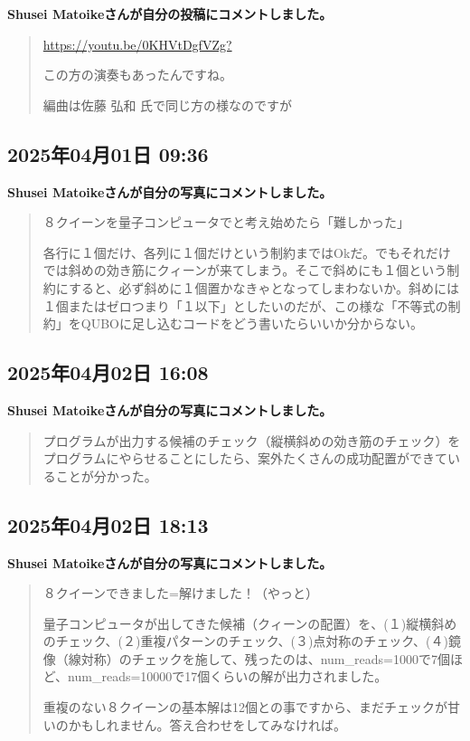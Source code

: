 \textbf{Shusei Matoikeさんが自分の投稿にコメントしました。}

\begin{quote}
\url{https://youtu.be/0KHVtDgfVZg?}

この方の演奏もあったんですね。

編曲は佐藤 弘和 氏で同じ方の様なのですが
\end{quote}

\subsection*{2025年04月01日 09:36}

\textbf{Shusei Matoikeさんが自分の写真にコメントしました。}

\begin{quote}
８クイーンを量子コンピュータでと考え始めたら「難しかった」

各行に１個だけ、各列に１個だけという制約まではOkだ。でもそれだけでは斜めの効き筋にクィーンが来てしまう。そこで斜めにも１個という制約にすると、必ず斜めに１個置かなきゃとなってしまわないか。斜めには１個またはゼロつまり「１以下」としたいのだが、この様な「不等式の制約」をQUBOに足し込むコードをどう書いたらいいか分からない。
\end{quote}

\subsection*{2025年04月02日 16:08}

\textbf{Shusei Matoikeさんが自分の写真にコメントしました。}

\begin{quote}
プログラムが出力する候補のチェック（縦横斜めの効き筋のチェック）をプログラムにやらせることにしたら、案外たくさんの成功配置ができていることが分かった。
\end{quote}

\subsection*{2025年04月02日 18:13}

\textbf{Shusei Matoikeさんが自分の写真にコメントしました。}

\begin{quote}
８クイーンできました=解けました！（やっと）

量子コンピュータが出してきた候補（クィーンの配置）を、(１)縦横斜めのチェック、(２)重複パターンのチェック、(３)点対称のチェック、(４)鏡像（線対称）のチェックを施して、残ったのは、num\_reads=1000で7個ほど、num\_reads=10000で17個くらいの解が出力されました。

重複のない８クイーンの基本解は12個との事ですから、まだチェックが甘いのかもしれません。答え合わせをしてみなければ。
\end{quote}

